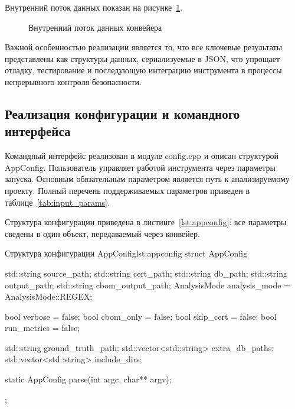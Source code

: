 \documentclass{itmo-vkr}
\begin{document}
	Внутренний поток данных показан на рисунке~\ref{fig:data-flow}.

\begin{figure}[ht]
  \centering
  \caption{Внутренний поток данных конвейера}
  \label{fig:data-flow}
\end{figure}

	Важной особенностью реализации является то, что все ключевые результаты представлены как структуры данных, сериализуемые в JSON, что упрощает отладку, тестирование и последующую интеграцию инструмента в процессы непрерывного контроля безопасности.
	
	\subsection{Реализация конфигурации и командного интерфейса}
	
	Командный интерфейс реализован в модуле config.cpp и описан структурой AppConfig. Пользователь управляет работой инструмента через параметры запуска. Основным обязательным параметром является путь к анализируемому проекту.
	Полный перечень поддерживаемых параметров приведен в таблице~\ref{tab:input_params}.
	
	
	Структура конфигурации приведена в листинге~\ref{lst:appconfig}: все параметры сведены в один объект, передаваемый через конвейер.

\begin{itmolisting}[C++]{Структура конфигурации AppConfig}{lst:appconfig}
struct AppConfig {
	std::string source_path;
	std::string cert_path;
	std::string db_path;
	std::string output_path;
	std::string cbom_output_path;
	AnalysisMode analysis_mode = AnalysisMode::REGEX;
	
	bool verbose = false;
	bool cbom_only = false;
	bool skip_cert = false;
	bool run_metrics = false;
	
	std::string ground_truth_path;
	std::vector<std::string> extra_db_paths;
	std::vector<std::string> include_dirs;
	
	static AppConfig parse(int argc, char** argv);
};
\end{itmolisting}
\end{document}
